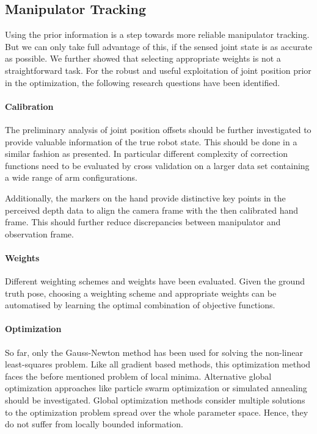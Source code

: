 \subsection{Manipulator Tracking}

Using the prior information is a step towards more reliable manipulator tracking. But we can only take full advantage of this, if the sensed joint state is as accurate as possible. We further showed that selecting appropriate weights is not a straightforward task.
For the robust and useful exploitation of joint position prior in the optimization, the following research questions have been identified.

\vspace{-0.04cm}

\paragraph{Calibration}
The preliminary analysis of joint position offsets should be further investigated to provide valuable information of the true robot state. This should be done in a similar fashion as presented. In particular different complexity of correction functions need to be evaluated by cross validation on a larger data set containing a wide range of arm configurations.

Additionally, the markers on the hand provide distinctive key points in the perceived depth data to align the camera frame with the then calibrated hand frame. This should further reduce discrepancies between manipulator and observation frame.

\vspace{-0.04cm}

\paragraph{Weights}
Different weighting schemes and weights have been evaluated. Given the ground truth pose, choosing a weighting scheme and appropriate weights can be automatised by learning the optimal combination of objective functions.

\vspace{-0.04cm}

\paragraph{Optimization}
So far, only the Gauss-Newton method has been used for solving the non-linear least-squares problem. Like all gradient based methods, this optimization method faces the before mentioned problem of local minima. Alternative global optimization approaches like particle swarm optimization or simulated annealing should be investigated. Global optimization methods consider multiple solutions to the optimization problem spread over the whole parameter space. Hence, they do not suffer from locally bounded information.


